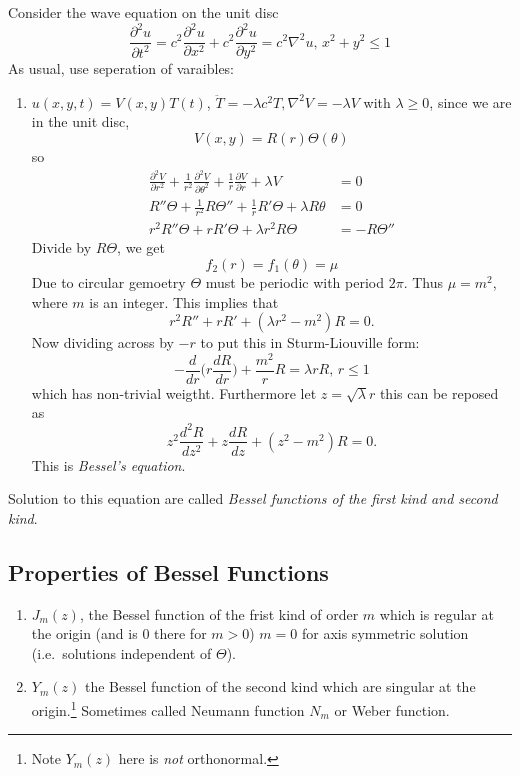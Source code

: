 \documentclass[a4paper]{article}
\begin{document}
Consider the wave equation on the unit disc
\[
  \frac{\partial^2 u}{\partial t^2} = c^2 \frac{\partial^2 u}{\partial x^2} + c^2 \frac{\partial^2 u}{\partial y^2} = c^2\nabla^2u, \, x^2+y^2\leq 1
\]
As usual, use seperation of varaibles:
\begin{enumerate}%
\item \(u(x,y,t) = V(x,y)T(t)\), \(\ddot T = -\lambda c^2T, \nabla^2V = -\lambda V\) with \(\lambda \geq 0\), since we are in the unit disc,
  \[
    V(x,y) = R(r) \Theta(\theta)
  \]
  so
  \begin{align*}
    \frac{\partial^2 V}{\partial r^2} + \frac{1}{r^2} \frac{\partial^2 V}{\partial \theta^2} + \frac{1}{r}\frac{\partial V}{\partial r} + \lambda V &= 0 \\
    R''\Theta + \frac{1}{r^2} R\Theta'' + \frac{1}{r}R'\Theta+\lambda R\theta &= 0 \\
    r^2R''\Theta+rR'\Theta+\lambda r^2R\Theta &= -R\Theta''
  \end{align*}
  Divide by \(R\Theta\), we get
  \[
    f_2(r) = f_1(\theta) = \mu
  \]
  Due to circular gemoetry \(\Theta\) must be periodic with period \(2\pi\). Thus \(\mu = m^2\), where \(m\) is an integer. This implies that
  \[
    r^2R'' + rR' + (\lambda r^2-m^2)R = 0.
  \]
  Now dividing across by \(-r\) to put this in Sturm-Liouville form:
  \[
    -\frac{d}{dr}\big( r \frac{d R}{d r} \big) + \frac{m^2}{r}R = \lambda r R, \, r\leq 1
  \]
  which has non-trivial weigtht. Furthermore let \(z = \sqrt\lambda r\) this can be reposed as
  \[
    z^2 \frac{d^2 R}{dz^2} + z \frac{d R}{d z} + (z^2-m^2)R = 0.
  \]
  This is \emph{Bessel's equation}.
\end{enumerate}

Solution to this equation are called \emph{Bessel functions of the first kind and second kind}.

\subsection{Properties of Bessel Functions}

\begin{enumerate}
\item \(J_m(z)\), the Bessel function of the frist kind of order \(m\) which is regular at the origin (and is \(0\) there for \(m>0\)) \(m=0\) for axis symmetric solution (i.e.\ solutions independent of \(\Theta\)).
\item \(Y_m(z)\) the Bessel function of the second kind which are singular at the origin.\footnote{Note \(Y_m(z)\) here is \emph{not} orthonormal.} Sometimes called Neumann function \(N_m\) or Weber function.
\end{enumerate}
    
\end{document}
